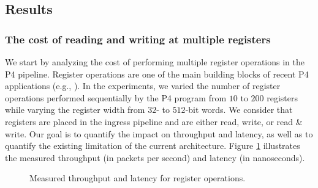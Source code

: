 \subsection{Results}

\subsubsection{The cost of reading and writing at multiple registers}

We start by analyzing the cost of performing multiple register operations in the P4 pipeline. Register operations are one of the main building blocks of recent P4 applications (e.g., \cite{hhh-sigcomm,WANG201998, xiong2019switches}). In the experiments, we varied the number of register operations performed sequentially by the P4 program from $10$ to $200$ registers while varying the register width from $32$- to $512$-bit words. We consider that registers are placed in the ingress pipeline and are either read, write, or read \& write. Our goal is to quantify the impact on throughput and latency, as well as to quantify the existing limitation of the current architecture. Figure \ref{fig1} illustrates the measured throughput (in packets per second) and latency (in nanoseconds).\\

\begin{figure}[!tb]
\centering
{}
        \caption{Measured throughput and latency for register operations.}
        \label{fig1}
\end{figure}

